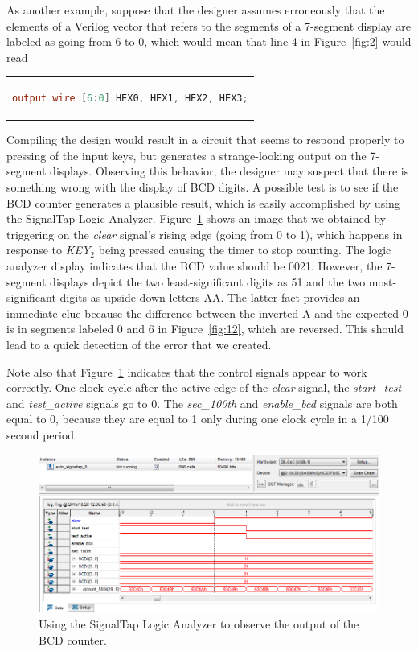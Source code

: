\documentclass[11pt, twoside, pdftex]{article}
\begin{document}
As another example, suppose that the designer assumes erroneously that the 
elements of a Verilog vector that refers to the segments of a 7-segment 
display are labeled as going from 6 to 0, which would mean that line 4 in 
Figure~\ref{fig:2} would read 
\begin{center}
\begin{tabular}{c}
\begin{lstlisting}[language=Verilog]
output wire [6:0] HEX0, HEX1, HEX2, HEX3;
\end{lstlisting}
\end{tabular}
\end{center}

\noindent
Compiling the design would result in a circuit that seems to respond properly
to pressing of the input keys, but generates a strange-looking output on the
7-segment displays. Observing this behavior, the designer may suspect that there
is something wrong with the display of BCD digits. A possible test is to
see if the BCD counter generates a plausible result, which is easily accomplished
by using the SignalTap Logic Analyzer. Figure~\ref{fig:22} shows an image that we obtained
by triggering on the {\it clear} signal's rising edge (going from 0 to 1), which 
happens in response to {\it KEY}$_2$ being pressed causing the timer to stop counting.
The logic analyzer display indicates that the BCD value should be 0021. However,
the 7-segment displays depict the two least-significant digits as 51 and the two
most-significant digits as upside-down letters AA. The latter fact provides an
immediate clue because the difference between the inverted A and the expected 0
is in segments labeled 0 and 6 in Figure~\ref{fig:12}, which are reversed. This should lead to
a quick detection of the error that we created.

Note also that Figure~\ref{fig:22} indicates that the control signals appear to
work correctly. One clock cycle after the active edge of the {\it clear}
signal, the {\it start\_test} and {\it test\_active} signals go to 0.
The {\it sec\_100th} and {\it enable\_bcd} signals are both equal to 0,
because they are equal to 1 only during one clock cycle in a 1/100 second period.

\begin{figure}[H]
   \begin{center}
      \includegraphics[scale=0.65]{figures/figure22.png}
   \caption{Using the SignalTap Logic Analyzer to observe the output of the BCD counter.} 
	 \label{fig:22}
	 \end{center}
\end{figure}
\end{document}
